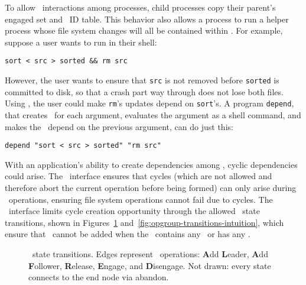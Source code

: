To allow \opgroup\ interactions among processes, child processes copy
their parent's engaged set and \opgroup\ ID table.
%
This behavior also allows a process to run a helper process whose file
system changes will all be contained within \anopgroup. For example,
suppose a user wants to run in their shell:
%
\vspace{-0.5\baselineskip}
\begin{center}
\begin{small}
\verb+sort < src > sorted && rm src+
\end{small}
\end{center}
\vspace{-0.5\baselineskip}
%
However, the user wants to ensure that \verb+src+ is not removed
before \verb+sorted+ is committed to disk, so that a crash part way
through does not lose both files.
%
Using \opgroups, the user could make \verb+rm+'s updates depend on
\verb+sort+'s.
%
A program \texttt{depend}, that creates \anopgroup\ for each argument,
evaluates the argument as a shell command, and makes the \opgroup\
depend on the previous argument, can do just this:
%
\vspace{-0.5\baselineskip}
\begin{center}
\begin{small}
\verb+depend "sort < src > sorted" "rm src"+
\end{small}
\end{center}
\vspace{-0.5\baselineskip}

With an application's ability to create dependencies among \opgroups,
cyclic dependencies could arise. The \opgroup\ interface ensures that
cycles (which are not allowed and therefore abort the current operation
before being formed) can only arise during \opgroup\ operations, ensuring
file system operations cannot fail due to cycles. The \opgroup\ interface
limits cycle creation opportunity through the allowed \opgroup\ state
transitions, shown in Figures~\ref{fig:opgroup-transitions-states}
and~\ref{fig:opgroup-transitions-intuition}, which ensure that \befores\
cannot be added when the \opgroup\ contains any \chdescs\ or has any
\afters.

\begin{figure}[htb]
\vspace{-0.5\baselineskip}
\vspace{-0.5\baselineskip}
\caption{\label{fig:opgroup-transitions-states} \Opgroup\ state
  transitions. Edges represent \opgroup\ operations: \textbf{A}dd
  \textbf{L}eader, \textbf{A}dd \textbf{F}ollower, \textbf{R}elease,
  \textbf{E}ngage, and \textbf{D}isengage. Not drawn: every state
  connects to the end node via abandon.}
\end{figure}

